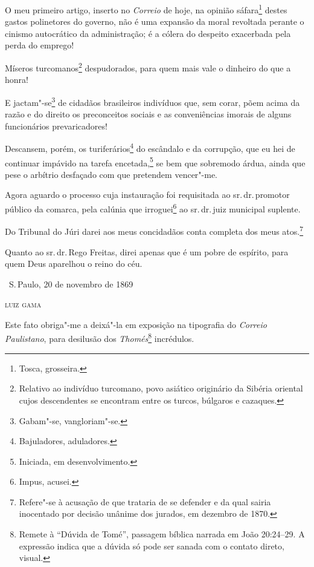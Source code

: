 O meu primeiro artigo, inserto no \emph{Correio} de hoje, na opinião
sáfara\footnote{Tosca, grosseira.} destes gastos polinetores do
governo, não é uma expansão da moral revoltada perante o cinismo
autocrático da administração; é a cólera do despeito exacerbada pela
perda do emprego!

Míseros turcomanos\footnote{Relativo ao indivíduo turcomano, povo
  asiático originário da Sibéria oriental cujos descendentes se
  encontram entre os turcos, búlgaros e cazaques.} despudorados, para
quem mais vale o dinheiro do que a honra!

E jactam"-se\footnote{Gabam"-se, vangloriam"-se.} de cidadãos brasileiros
indivíduos que, sem corar, põem acima da razão e do direito os
preconceitos sociais e as conveniências imorais de alguns funcionários
prevaricadores!

Descansem, porém, os turiferários\footnote{Bajuladores, aduladores.}
do escândalo e da corrupção, que eu hei de continuar impávido na tarefa
encetada,\footnote{Iniciada, em desenvolvimento.} se bem que sobremodo
árdua, ainda que pese o arbítrio desfaçado com que pretendem vencer"-me.

Agora aguardo o processo cuja instauração foi requisitada ao sr.\,dr.\,promotor público da comarca, pela calúnia que irroguei\footnote{Impus,
  acusei.} ao sr.\,dr.\,juiz municipal suplente.

Do Tribunal do Júri darei aos meus concidadãos conta completa dos meus
atos.\footnote{Refere"-se à acusação de que trataria de se defender e da
  qual sairia inocentado por decisão unânime dos jurados, em dezembro de 1870.}

Quanto ao sr.\,dr.\,Rego Freitas, direi apenas que é um pobre de espírito,
para quem Deus aparelhou o reino do céu.

\medskip

\hfill\ S.\,Paulo, 20 de novembro de 1869\smallskip

\hfill\textsc{luiz gama}

\medskip

\noindent{}


\noindent{}Este fato obriga"-me a deixá"-la em exposição na tipografia do
\emph{Correio Paulistano}, para desilusão dos \emph{Thomés}\footnote{
  Remete à ``Dúvida de Tomé'', passagem bíblica narrada em João 20:24--29.
  A expressão indica que a dúvida só pode ser sanada com o contato
  direto, visual.}
incrédulos.


